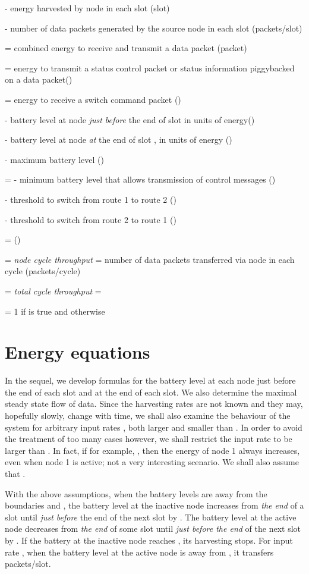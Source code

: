 \documentclass[12 pt]{article}
\newcommand{\debug}[1]{\mbox{\tt #1}}
\renewcommand{\debug}[1]{}              \newcommand{\cmd}[1]{}
\newcommand{\msec}[2]{\renewcommand{\sname}{}\section[#1
	\debug{\fbox {#2}}]{#1 \cmd{msec} \dlabelx{#2}}\markboth{\today}{Sec. \thesection}}
\begin{document}
\begin{description}
\item{} - energy harvested by node  in each slot  (slot)
\item{} - number of data packets generated by the source node in each slot (packets/slot)
\item{} = combined energy to receive and transmit a data packet (packet)
\item{} = energy to transmit a status control packet or status information piggybacked on a data packet()
\item{} = energy to receive a switch command packet ()
\item{} - battery level at node  \emph{just before} the end of slot  in units of energy()
\item{} - battery level at node  \emph{at} the end of slot , in units of energy ()
\item{} - maximum battery level ()
\item{} =  - minimum battery level that allows transmission of control messages ()
\item{} - threshold to switch from route 1 to route 2 ()
\item{} - threshold to switch from route 2 to route 1 ()
\item {} =  ()
\item {} = \emph{node cycle throughput} = number of data packets transferred via node  in each cycle (packets/cycle)
\item {} = \emph{total cycle throughput} = 
\item{} = 1 if  is true and  otherwise
\end{description}



\msec{Energy equations}{energy}

In the sequel, we develop formulas for the battery level at each node just before the end of each slot and at the end of each slot.  We also determine the maximal steady state flow   of data.
Since the harvesting rates are not known and they may, hopefully slowly, change with time, we shall also examine the behaviour of the system for arbitrary input rates , both larger and smaller than .
In order to avoid the treatment of too many cases however, we shall restrict the input rate to be larger than .  In fact, if for example, , then the energy of node 1 always increases, even when node 1 is active; not a very interesting scenario.  We shall also assume that .

With the above assumptions, when the battery levels are away from the boundaries  and , the battery level at the inactive node  increases from \emph{the end} of a slot until \emph{just before} the end of the next slot by .  The battery level at the active node  decreases from \emph{the end} of some slot until \emph{just before the end} of the next slot by .  If the battery at the inactive node reaches , its harvesting stops.  For input rate , when the battery level at the active node  is away from , it transfers  packets/slot.
\end{document}
